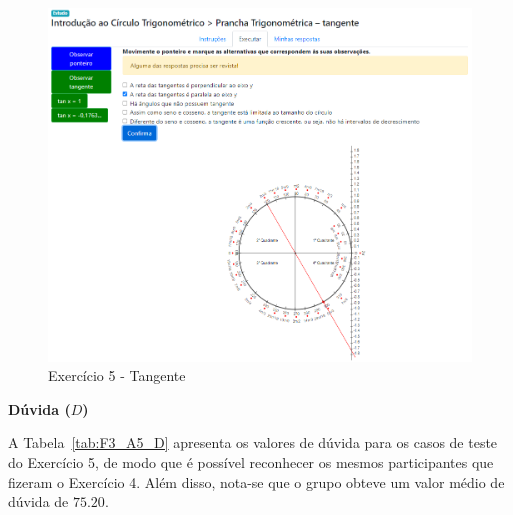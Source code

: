 \begin{figure}[htb]
	\centering
	\includegraphics[width=0.9\linewidth]{chapters/results/Fase 3/E5_Virtual.png}
	\caption{Exercício 5 - Tangente}
	\label{fig:E5}
\end{figure}


\textbf{Dúvida ($D$)}

A Tabela~\ref{tab:F3_A5_D} apresenta os valores de dúvida para os casos de teste do Exercício 5, de modo que é possível reconhecer os mesmos participantes que fizeram o Exercício 4. Além disso, nota-se que o grupo obteve um valor médio de dúvida de $75.20$.

